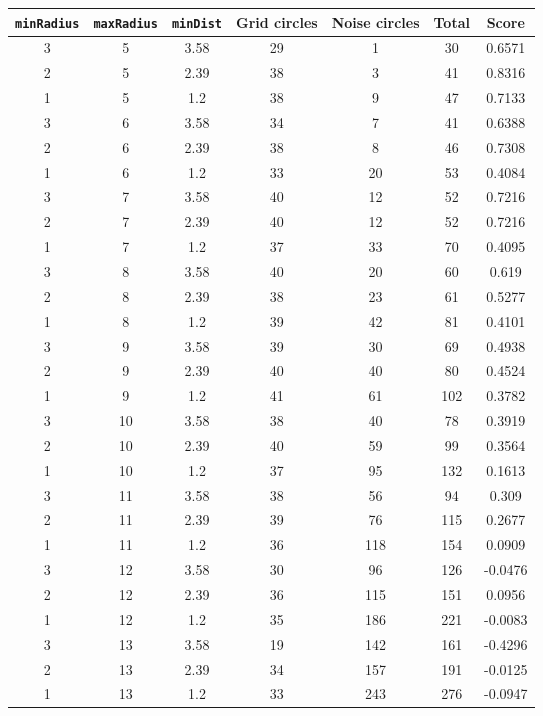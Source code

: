 \documentclass[letterpaper, 12pt]{article}
\begin{document}
\begin{longtable}{|c|c|c|c|c|c|c|}
\hline
\textbf{\texttt{minRadius}} & \textbf{\texttt{maxRadius}} & \textbf{\texttt{minDist}} & \textbf{Grid circles} & \textbf{Noise circles} & \textbf{Total} & \textbf{Score} \\
\hline
3 & 5 & 3.58 & 29 & 1 & 30 & 0.6571 \\
\hline
2 & 5 & 2.39 & 38 & 3 & 41 & 0.8316 \\
\hline
1 & 5 & 1.2 & 38 & 9 & 47 & 0.7133 \\
\hline
3 & 6 & 3.58 & 34 & 7 & 41 & 0.6388 \\
\hline
2 & 6 & 2.39 & 38 & 8 & 46 & 0.7308 \\
\hline
1 & 6 & 1.2 & 33 & 20 & 53 & 0.4084 \\
\hline
3 & 7 & 3.58 & 40 & 12 & 52 & 0.7216 \\
\hline
2 & 7 & 2.39 & 40 & 12 & 52 & 0.7216 \\
\hline
1 & 7 & 1.2 & 37 & 33 & 70 & 0.4095 \\
\hline
3 & 8 & 3.58 & 40 & 20 & 60 & 0.619 \\
\hline
2 & 8 & 2.39 & 38 & 23 & 61 & 0.5277 \\
\hline
1 & 8 & 1.2 & 39 & 42 & 81 & 0.4101 \\
\hline
3 & 9 & 3.58 & 39 & 30 & 69 & 0.4938 \\
\hline
2 & 9 & 2.39 & 40 & 40 & 80 & 0.4524 \\
\hline
1 & 9 & 1.2 & 41 & 61 & 102 & 0.3782 \\
\hline
3 & 10 & 3.58 & 38 & 40 & 78 & 0.3919 \\
\hline
2 & 10 & 2.39 & 40 & 59 & 99 & 0.3564 \\
\hline
1 & 10 & 1.2 & 37 & 95 & 132 & 0.1613 \\
\hline
3 & 11 & 3.58 & 38 & 56 & 94 & 0.309 \\
\hline
2 & 11 & 2.39 & 39 & 76 & 115 & 0.2677 \\
\hline
1 & 11 & 1.2 & 36 & 118 & 154 & 0.0909 \\
\hline
3 & 12 & 3.58 & 30 & 96 & 126 & -0.0476 \\
\hline
2 & 12 & 2.39 & 36 & 115 & 151 & 0.0956 \\
\hline
1 & 12 & 1.2 & 35 & 186 & 221 & -0.0083 \\
\hline
3 & 13 & 3.58 & 19 & 142 & 161 & -0.4296 \\
\hline
2 & 13 & 2.39 & 34 & 157 & 191 & -0.0125 \\
\hline
1 & 13 & 1.2 & 33 & 243 & 276 & -0.0947 \\

\end{longtable}
\end{document}
